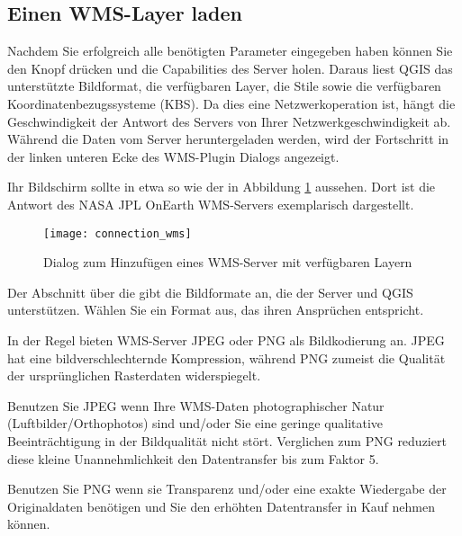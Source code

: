 \subsection{Einen WMS-Layer laden}\label{sec:ogc-wms-layers}

Nachdem Sie erfolgreich alle benötigten Parameter eingegeben haben können Sie
den Knopf  drücken und die Capabilities des Server holen.
Daraus liest QGIS das unterstützte Bildformat, die verfügbaren Layer, die
Stile sowie die verfügbaren Koordinatenbezugssysteme (KBS).
Da dies eine Netzwerkoperation ist, hängt die Geschwindigkeit der Antwort des
Servers von Ihrer Netzwerkgeschwindigkeit ab. Während die Daten vom Server
heruntergeladen werden, wird der Fortschritt in der linken unteren Ecke des
WMS-Plugin Dialogs angezeigt.

Ihr Bildschirm sollte in etwa so wie der in Abbildung \ref{fig:connection_wms}
aussehen. Dort ist die Antwort des NASA JPL OnEarth WMS-Servers exemplarisch
dargestellt.

\begin{figure}[ht]
  \begin{center}
  	\caption{Dialog zum Hinzufügen eines WMS-Server mit verfügbaren Layern \nixcaption}\label{fig:connection_wms}
	\texttt{[image: connection\_wms]}
  \end{center}
\end{figure}


Der Abschnitt über die  gibt die Bildformate an,
die der Server und QGIS unterstützen. Wählen Sie ein Format aus, das ihren
Ansprüchen entspricht.

\begin{Tip}[h]\caption{\textsc{Bildkodierung}}
In der Regel bieten WMS-Server JPEG oder PNG als Bildkodierung an.
JPEG hat eine bildverschlechternde Kompression, während PNG zumeist die
Qualität der ursprünglichen Rasterdaten widerspiegelt.

Benutzen Sie JPEG wenn Ihre WMS-Daten photographischer Natur
(Luftbilder/Orthophotos) sind und/oder Sie eine geringe qualitative
Beeinträchtigung in der Bildqualität nicht stört.
Verglichen zum PNG reduziert diese kleine Unannehmlichkeit den Datentransfer
bis zum Faktor 5.

Benutzen Sie PNG wenn sie Transparenz und/oder eine exakte Wiedergabe der
Originaldaten benötigen und Sie den erhöhten Datentransfer in Kauf nehmen
können.
\end{Tip}

